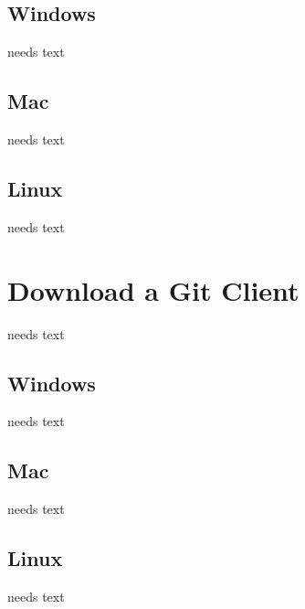 \documentclass[a4paper,10pt,twoside]{book}
\begin{document}
\subsection{Windows}
needs text

\subsection{Mac}
needs text

\subsection{Linux}
needs text

\section{Download a Git Client}
needs text

\subsection{Windows}
needs text

\subsection{Mac}
needs text

\subsection{Linux}
needs text


\ifx\wholebook\relax\else
   
   
\end{document}

